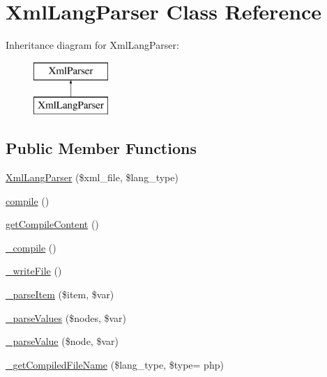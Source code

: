 \hypertarget{classXmlLangParser}{}\section{Xml\+Lang\+Parser Class Reference}
\label{classXmlLangParser}
Inheritance diagram for Xml\+Lang\+Parser\+:\begin{figure}[H]
\begin{center}
\leavevmode
\includegraphics[height=2.000000cm]{classXmlLangParser}
\end{center}
\end{figure}
\subsection*{Public Member Functions}
\begin{DoxyCompactItemize}
\item 
\hyperlink{classXmlLangParser_a50fff41b01cd305204a85b48702a4e6f}{Xml\+Lang\+Parser} (\$xml\+\_\+file, \$lang\+\_\+type)
\item 
\hyperlink{classXmlLangParser_af0ffe6cf9e15d7af2ca16d5d9b7d5da1}{compile} ()
\item 
\hyperlink{classXmlLangParser_ab022a8d8d0717fbf4c8a171eaf6a54d2}{get\+Compile\+Content} ()
\item 
\hyperlink{classXmlLangParser_a6a27a9fbdd65d3ea3249120f8eb7d9c2}{\+\_\+compile} ()
\item 
\hyperlink{classXmlLangParser_ab49d81ff3d154da6c5d92f0367d33ec9}{\+\_\+write\+File} ()
\item 
\hyperlink{classXmlLangParser_a87379004e371e1812094e2bf802b274c}{\+\_\+parse\+Item} (\$item, \$var)
\item 
\hyperlink{classXmlLangParser_ac5ab3f7e29a914802e1b6144e6e8bcc5}{\+\_\+parse\+Values} (\$nodes, \$var)
\item 
\hyperlink{classXmlLangParser_a45b4e9645eb03c7ff7bdbda239148867}{\+\_\+parse\+Value} (\$node, \$var)
\item 
\hyperlink{classXmlLangParser_ab5049af4a722b0c2f7d8eed3c8c4dac0}{\+\_\+get\+Compiled\+File\+Name} (\$lang\+\_\+type, \$type= \textquotesingle{}php\textquotesingle{})
\end{DoxyCompactItemize}
